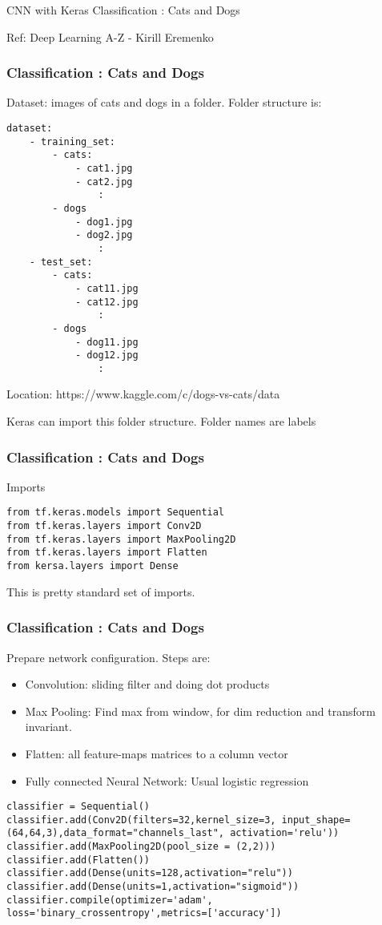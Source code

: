 \begin{frame}
  \begin{center}
    {\Large CNN with Keras Classification : Cats and Dogs}
    
    {Ref: Deep Learning A-Z - Kirill Eremenko}
  \end{center}
\end{frame}

\begin{frame}[fragile] \frametitle{Classification : Cats and Dogs}
Dataset: images of cats and dogs in a folder. Folder structure is:
\begin{lstlisting}
dataset:
	- training_set:
		- cats:
			- cat1.jpg
			- cat2.jpg		
				:	
		- dogs
			- dog1.jpg
			- dog2.jpg		
				:	
	- test_set:
		- cats:
			- cat11.jpg
			- cat12.jpg		
				:	
		- dogs
			- dog11.jpg
			- dog12.jpg		
				:					
\end{lstlisting}

Location: https://www.kaggle.com/c/dogs-vs-cats/data

Keras can import this folder structure. Folder names are labels
\end{frame}

\begin{frame}[fragile] \frametitle{Classification : Cats and Dogs}
Imports
\begin{lstlisting}
from tf.keras.models import Sequential
from tf.keras.layers import Conv2D
from tf.keras.layers import MaxPooling2D
from tf.keras.layers import Flatten
from kersa.layers import Dense
\end{lstlisting}

This is pretty standard set of imports.
\end{frame}

\begin{frame}[fragile] \frametitle{Classification : Cats and Dogs}
Prepare network configuration. Steps are:
\begin{itemize}
\item Convolution: sliding filter and doing dot products
\item Max Pooling: Find max from window, for dim reduction and transform invariant.
\item Flatten: all feature-maps matrices to a column vector
\item Fully connected Neural Network: Usual logistic regression
\end{itemize}
\begin{lstlisting}
classifier = Sequential()
classifier.add(Conv2D(filters=32,kernel_size=3, input_shape=(64,64,3),data_format="channels_last", activation='relu'))
classifier.add(MaxPooling2D(pool_size = (2,2)))
classifier.add(Flatten())
classifier.add(Dense(units=128,activation="relu"))
classifier.add(Dense(units=1,activation="sigmoid"))
classifier.compile(optimizer='adam', loss='binary_crossentropy',metrics=['accuracy'])
\end{lstlisting}

\end{frame}

